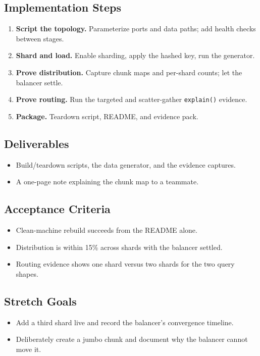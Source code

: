 \subsection*{Implementation Steps}
\begin{enumerate}
    \item \textbf{Script the topology.} Parameterize ports and data paths; add health checks between stages.
    \item \textbf{Shard and load.} Enable sharding, apply the hashed key, run the generator.
    \item \textbf{Prove distribution.} Capture chunk maps and per-shard counts; let the balancer settle.
    \item \textbf{Prove routing.} Run the targeted and scatter-gather \texttt{explain()} evidence.
    \item \textbf{Package.} Teardown script, README, and evidence pack.
\end{enumerate}

\subsection*{Deliverables}
\begin{itemize}
    \item Build/teardown scripts, the data generator, and the evidence captures.
    \item A one-page note explaining the chunk map to a teammate.
\end{itemize}

\subsection*{Acceptance Criteria}
\begin{itemize}
    \item Clean-machine rebuild succeeds from the README alone.
    \item Distribution is within 15\% across shards with the balancer settled.
    \item Routing evidence shows one shard versus two shards for the two query shapes.
\end{itemize}

\subsection*{Stretch Goals}
\begin{itemize}
    \item Add a third shard live and record the balancer's convergence timeline.
    \item Deliberately create a jumbo chunk and document why the balancer cannot move it.
\end{itemize}
